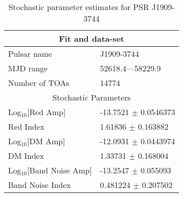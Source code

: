 \documentclass{article}
\begin{document}
\begin{table*}
\caption{Stochastic parameter estimates for PSR J1909-3744}
\begin{tabular}{ll}
\hline\hline
\multicolumn{2}{c}{Fit and data-set} \\ 
\hline
Pulsar name\dotfill & J1909-3744 \\ 
MJD range\dotfill & 52618.4---58229.9 \\ 
Number of TOAs\dotfill & 14774 \\
\hline
\multicolumn{2}{c}{Stochastic Parameters} \\ 
\hline
Log$_{10}$[Red Amp] \dotfill & -13.7521 $\pm$ 0.0546373  \\ 
Red Index \dotfill & 1.61836 $\pm$ 0.163882  \\ 
Log$_{10}$[DM Amp] \dotfill & -12.0931 $\pm$ 0.0443974  \\ 
DM Index \dotfill & 1.33731 $\pm$ 0.168004  \\ 
Log$_{10}$[Band Noise Amp] \dotfill & -13.2547 $\pm$ 0.055093  \\ 
Band Noise Index \dotfill & 0.481224 $\pm$ 0.207502  \\ 
\hline
\end{tabular}
\label{Table:J1909-3744}
\end{table*} 
\end{document}
